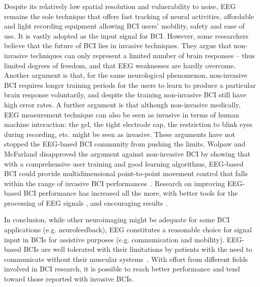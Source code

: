 Despite its relatively low spatial resolution and vulnerability to noise, EEG remains the sole technique that offers fast tracking of neural activities, affordable and light recording equipment allowing BCI users' mobility, safety and ease of use.
It is vastly adopted as the input signal for BCI. 
However, some researchers believe that the future of BCI lies in invasive techniques. 
They argue that non-invasive techniques can only represent a limited number of brain responses -- thus limited degrees of freedom, and that EEG weaknesses are hardly overcome. 
Another argument is that, for the same neurological phenomenon, non-invasive BCI requires longer training periods for the users  to learn to produce a particular brain response voluntarily, and despite the training non-invasive BCI still have high error rates. %
A further argument is that although non-invasive medically, EEG measurement technique can also be seen as invasive in terms of human machine interaction: the gel, the tight electrode cap, the restriction to blink eyes during recording, etc. might be seen as invasive.
These arguments have not stopped the EEG-based BCI community from pushing the limits. 
Wolpaw and McFarland disapproved the argument against non-invasive BCI by showing that with a comprehensive user training and good learning algorithms, EEG-based BCI could provide multidimensional point-to-point movement control that falls within the range of invasive BCI performances~\citep{wolpaw_control_2004}.
Research on improving EEG-based BCI performance has increased all the more, with better tools for the processing of EEG signals \citep{gramfort_mne_2014}, and encouraging results \citep{mattout_improving_2013, kalunga_online_2016}.  

In conclusion, while other neuroimaging might be adequate for some BCI applications (e.g. neurofeedback), EEG constitutes a reasonable choice for signal input in BCIs for assistive purposes (e.g. communication and mobility). 
EEG-based BCIs are well tolerated with their limitations by patients with the need to communicate without their muscular systems~\citep{kubler_severity_2005, grubler_psychosocial_2014}. 
With effort from different fields involved in BCI research, it is possible to reach better performance and tend toward those reported with invasive BCIs.  

  
%

